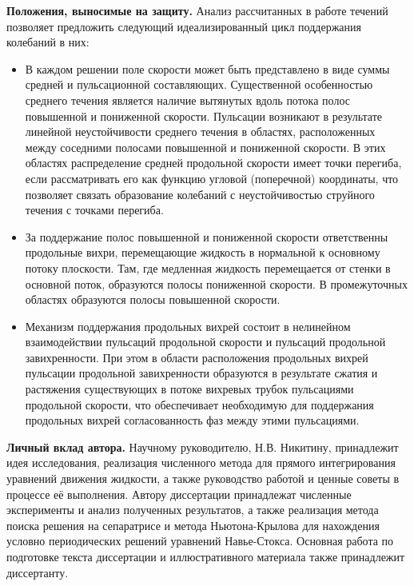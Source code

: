 {\bf Положения, выносимые на защиту.} Анализ рассчитанных в работе течений позволяет предложить следующий идеализированный цикл поддержания колебаний в них:
\begin{itemize}
\item В каждом решении поле скорости может быть представлено в виде суммы средней и пульсационной составляющих. Существенной особенностью среднего течения является наличие вытянутых вдоль потока полос повышенной и пониженной скорости. Пульсации возникают в результате линейной неустойчивости среднего течения в областях, расположенных между соседними полосами повышенной и пониженной скорости. В этих областях распределение средней продольной скорости имеет точки перегиба, если рассматривать его как функцию угловой (поперечной) координаты, что позволяет связать образование колебаний с неустойчивостью струйного течения с точками перегиба. 
\item За поддержание полос повышенной и пониженной скорости ответственны продольные вихри, перемещающие жидкость в нормальной к основному потоку плоскости. Там, где медленная жидкость перемещается от стенки в основной поток, образуются полосы пониженной скорости. В промежуточных областях образуются полосы повышенной скорости. 
\item Механизм поддержания продольных вихрей состоит в нелинейном взаимодействии пульсаций продольной скорости и пульсаций продольной завихренности. При этом в области расположения продольных вихрей пульсации продольной завихренности образуются в результате сжатия и растяжения существующих в потоке вихревых трубок пульсациями продольной скорости, что обеспечивает необходимую для поддержания продольных вихрей согласованность фаз между этими пульсациями. 
\end{itemize}

{\bf Личный вклад автора.} 
Научному руководителю, Н.В. Никитину, принадлежит идея исследования, реализация численного метода для прямого интегрирования уравнений движения жидкости, а также руководство работой и ценные советы в процессе её выполнения. Автору диссертации принадлежат численные эксперименты и анализ полученных результатов, а также реализация метода поиска решения на сепаратрисе и метода Ньютона-Крылова для нахождения условно периодических решений уравнений Навье-Стокса. Основная работа по подготовке текста диссертации и иллюстративного материала также принадлежит диссертанту. 



